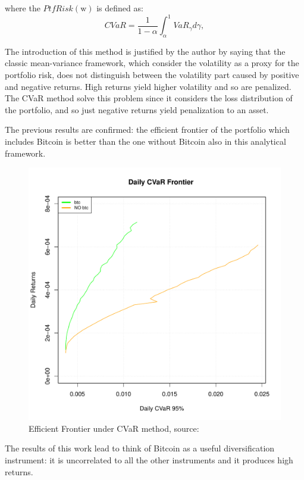 where the $PtfRisk \left( \text{w} \right)$ is defined as:
\begin{equation}
    CVaR = \frac{1}{1-\alpha} \int_{\alpha}^1 VaR_\gamma d\gamma ,
\end{equation}


The introduction of this method is justified by the author by saying that the classic mean-variance framework, which consider the volatility as a proxy for the portfolio risk, does not distinguish between the volatility part caused by positive and negative returns. High returns yield higher volatility and so are penalized. The CVaR method solve this problem since it considers the loss distribution of the portfolio, and so just negative returns yield penalization to an asset.

The previous results are confirmed: the efficient frontier of the portfolio which includes Bitcoin is better than the one without Bitcoin also in this analytical framework.

\begin{figure}[H]
    \centering
    \includegraphics[width=13cm]{Images/images_samuele/efficient_frontier_CVaR.pdf}
    \caption{Efficient Frontier under CVaR method, source: \citep{samuele}}
\end{figure}

The results of this work lead to think of Bitcoin as a useful diversification instrument: it is uncorrelated to all the other instruments and it produces high returns.

